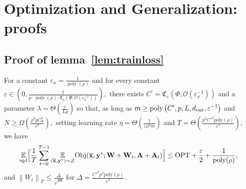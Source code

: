 \section{Optimization and Generalization: proofs}\label{sec:optim_general_proofs}
\subsection{Proof of lemma~\ref{lem:trainloss}}
\begin{lemma}\label{lem:trainloss_proof}
	For a constant $\varepsilon_x = \frac{1}{\operatorname{poly}(\rho)}$ and for every constant $\varepsilon \in \left(0, \frac{1}{p \cdot \operatorname{poly}(\rho) \cdot \mathfrak{C}_{\mathfrak{s}}(\Phi, \mathcal{O}(\varepsilon_x^{-1}))}\right),$ there exists $C^{\prime}=\mathfrak{C}_{\varepsilon}(\Phi, \mathcal{O}(\varepsilon_x^{-1}))$ and a parameter $\lambda=\Theta\left(\frac{\varepsilon}{L \rho}\right)$
	so that, as long as $m \geq \operatorname{poly}\left(C', p, L, d_{\mathrm{out}} , \varepsilon^{-1}\right)$ and $N \geq \Omega\left(\frac{\rho^{3} p C_{\Phi}^2}{\varepsilon^2}\right),$ setting learning rate $\eta=\Theta\left(\frac{1}{\varepsilon \rho^{2} m}\right)$ and
	$T=\Theta\left(\frac{p^{2}  C'^2 \mathrm{poly}(\rho)}{\varepsilon^{2}}\right),$ we have
	\begin{align*}
		\underset{\mathrm{sgd}}{\mathbb{E}}\Big[\frac{1}{T} \sum_{t=0}^{T-1}  \underset{(\overline{\mathbf{x}}, \mathbf{y}^{\ast}) \sim \mathcal{Z}}{\mathbb{E}} \mathrm{Obj}(\overline{\mathbf{x}}, \mathbf{y}^{\ast};  \mathbf{W}+\mathbf{W}_{t}, \mathbf{A} + \mathbf{A}_t) \Big] \leq \mathrm{OPT} + \frac{\varepsilon}{2} + \frac{1}{\mathrm{poly}(\rho)},
	\end{align*}
	and $\left\|W_{t}\right\|_{F} \leq \frac{\Delta}{\sqrt{m}}$ for $\Delta=\frac{C'^{2} p^{2} \mathrm { poly }(\rho)}{\varepsilon^{2}}$.
\end{lemma}

